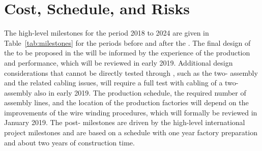 \section{Cost, Schedule, and Risks}
\label{sec:fdsp-apa-cost-sched}



The high-level milestones for the period 2018 to 2024 are given in Table~\ref{tab:milestones} for the periods before and after the . The final design of the  to be proposed in the  will be informed by the experience of the   production and performance, which will be reviewed in early 2019. Additional design considerations that cannot be directly tested through , such as the two- assembly and the related cabling issues, will require a full test with cabling of a two- assembly also in early 2019. The production schedule, the required number of assembly lines, and the location of the production factories will depend on the improvements of the wire winding procedures, which will formally be reviewed in January 2019. The post- milestones are driven by the high-level international project milestones and are based on a schedule with one year factory preparation and about two years of  construction time.

